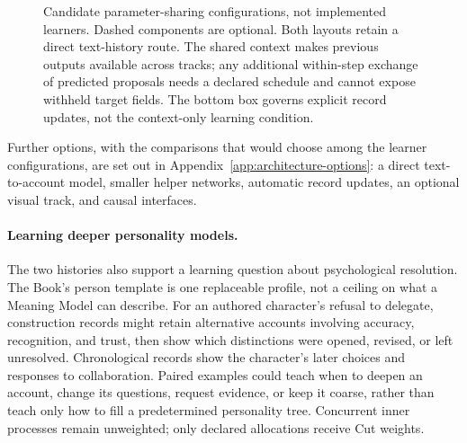\documentclass[10pt]{article}
\begin{document}
\begin{figure}[!htbp]
\caption{Candidate parameter-sharing configurations, not implemented learners.
Dashed components are optional. Both layouts retain a direct text-history
route. The shared context makes previous outputs available across tracks;
any additional within-step exchange of predicted proposals needs a declared
schedule and cannot expose withheld target fields. The bottom box governs
explicit record updates, not the context-only learning condition.}
\label{fig:learner-architectures}
\end{figure}

Further options, with the comparisons that would choose among the learner
configurations, are set out in Appendix~\ref{app:architecture-options}: a direct
text-to-account model, smaller helper networks, automatic record updates, an
optional visual track, and causal interfaces.

\paragraph{Learning deeper personality models.}
The two histories also support a learning question about psychological
resolution. The Book's person template is one replaceable profile, not a
ceiling on what a Meaning Model can describe. For an authored character's
refusal to delegate, construction records might retain alternative accounts
involving accuracy, recognition, and trust, then show which distinctions were
opened, revised, or left unresolved. Chronological records show the character's
later choices and responses to collaboration. Paired examples could teach when
to deepen an account, change its questions, request evidence, or keep it coarse,
rather than teach only how to fill a predetermined personality tree. Concurrent
inner processes remain unweighted; only declared allocations receive Cut
weights.
\end{document}
